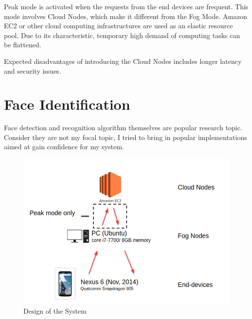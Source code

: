 Peak mode is activated when the requests from the end devices are frequent. This mode involves Cloud Nodes, which make it different from the Fog Mode. Amazon EC2 or other cloud computing infrastructures are used as an elastic resource pool. Due to its characteristic, temporary high demand of computing tasks can be flattened.

Expected disadvantages of introducing the Cloud Nodes includes longer latency and security issues.

\section{Face Identification}
Face detection and recognition algorithm themselves are popular research topic. Consider they are not my focal topic, I tried to bring in popular implementations aimed at gain confidence for my system.



\begin{figure}
    \centering
    \includegraphics[width=\textwidth]{images/design-of-the-system.png}
    \caption{Design of the System}
    \label{fig:design_of_the_system}
\end{figure}


